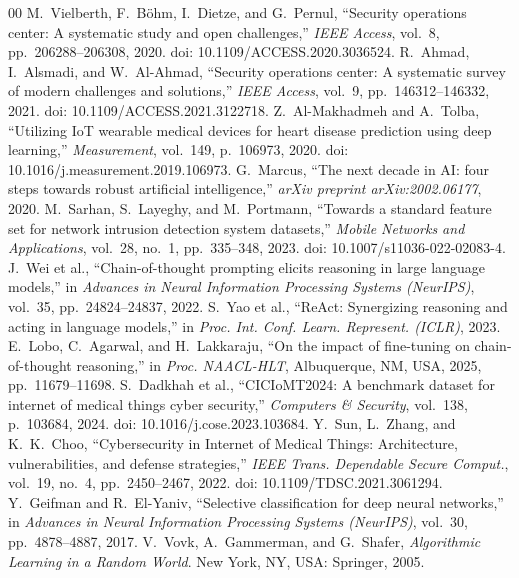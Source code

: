 \documentclass{ieeeaccess}
\begin{document}
\balance
\begin{thebibliography}{00}
 M.~Vielberth, F.~B{\"o}hm, I.~Dietze, and G.~Pernul, ``Security operations center: A systematic study and open challenges,'' \textit{IEEE Access}, vol.~8, pp.~206288--206308, 2020. doi: 10.1109/ACCESS.2020.3036524.
 R.~Ahmad, I.~Alsmadi, and W.~Al-Ahmad, ``Security operations center: A systematic survey of modern challenges and solutions,'' \textit{IEEE Access}, vol.~9, pp.~146312--146332, 2021. doi: 10.1109/ACCESS.2021.3122718.
 Z.~Al-Makhadmeh and A.~Tolba, ``Utilizing IoT wearable medical devices for heart disease prediction using deep learning,'' \textit{Measurement}, vol.~149, p.~106973, 2020. doi: 10.1016/j.measurement.2019.106973.
 G.~Marcus, ``The next decade in AI: four steps towards robust artificial intelligence,'' \textit{arXiv preprint arXiv:2002.06177}, 2020.
 M.~Sarhan, S.~Layeghy, and M.~Portmann, ``Towards a standard feature set for network intrusion detection system datasets,'' \textit{Mobile Networks and Applications}, vol.~28, no.~1, pp.~335--348, 2023. doi: 10.1007/s11036-022-02083-4.
 J.~Wei et al., ``Chain-of-thought prompting elicits reasoning in large language models,'' in \textit{Advances in Neural Information Processing Systems (NeurIPS)}, vol.~35, pp.~24824--24837, 2022.
 S.~Yao et al., ``ReAct: Synergizing reasoning and acting in language models,'' in \textit{Proc. Int. Conf. Learn. Represent. (ICLR)}, 2023.
 E.~Lobo, C.~Agarwal, and H.~Lakkaraju, ``On the impact of fine-tuning on chain-of-thought reasoning,'' in \textit{Proc. NAACL-HLT}, Albuquerque, NM, USA, 2025, pp.~11679--11698.
 S.~Dadkhah et al., ``CICIoMT2024: A benchmark dataset for internet of medical things cyber security,'' \textit{Computers \& Security}, vol.~138, p.~103684, 2024. doi: 10.1016/j.cose.2023.103684.
 Y.~Sun, L.~Zhang, and K.~K.~Choo, ``Cybersecurity in Internet of Medical Things: Architecture, vulnerabilities, and defense strategies,'' \textit{IEEE Trans. Dependable Secure Comput.}, vol.~19, no.~4, pp.~2450--2467, 2022. doi: 10.1109/TDSC.2021.3061294.
 Y.~Geifman and R.~El-Yaniv, ``Selective classification for deep neural networks,'' in \textit{Advances in Neural Information Processing Systems (NeurIPS)}, vol.~30, pp.~4878--4887, 2017.
 V.~Vovk, A.~Gammerman, and G.~Shafer, \textit{Algorithmic Learning in a Random World}. New York, NY, USA: Springer, 2005.

\end{thebibliography}
\end{document}
